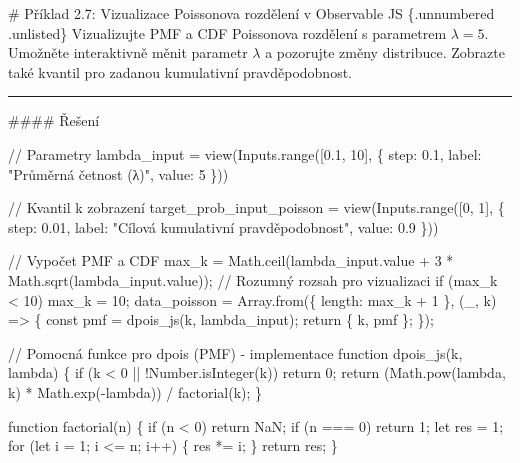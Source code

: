 \documentclass[
  czech,
  11pt,
  letterpaper,
  DIV=11,
  numbers=noendperiod]{scrreprt}
\newenvironment{Shaded}{\begin{snugshade}}{\end{snugshade}}
\newcommand{\NormalTok}[1]{\textcolor[rgb]{0.00,0.23,0.31}{#1}}
\begin{document}
\begin{tcolorbox}[enhanced jigsaw, arc=.35mm, bottomrule=.15mm, bottomtitle=1mm, breakable, colback=white, colbacktitle=quarto-callout-note-color!10!white, colframe=quarto-callout-note-color-frame, coltitle=black, left=2mm, leftrule=.75mm, opacityback=0, opacitybacktitle=0.6, rightrule=.15mm, title=\textcolor{quarto-callout-note-color}{\faInfo}\hspace{0.5em}{Poznámka}, titlerule=0mm, toprule=.15mm, toptitle=1mm]

\# Příklad 2.7: Vizualizace Poissonova rozdělení v Observable JS
\{.unnumbered .unlisted\} Vizualizujte PMF a CDF Poissonova rozdělení s
parametrem \(\lambda=5\). Umožněte interaktivně měnit parametr
\(\lambda\) a pozorujte změny distribuce. Zobrazte také kvantil pro
zadanou kumulativní pravděpodobnost.

\begin{center}\rule{0.5\linewidth}{0.5pt}\end{center}

\#\#\#\# Řešení

\begin{Shaded}
\begin{Highlighting}[]
\NormalTok{// Parametry}
\NormalTok{lambda\_input = view(Inputs.range([0.1, 10], \{ step: 0.1, label: "Průměrná četnost (λ)", value: 5 \}))}

\NormalTok{// Kvantil k zobrazení}
\NormalTok{target\_prob\_input\_poisson = view(Inputs.range([0, 1], \{ step: 0.01, label: "Cílová kumulativní pravděpodobnost", value: 0.9 \}))}

\NormalTok{// Vypočet PMF a CDF}
\NormalTok{max\_k = Math.ceil(lambda\_input.value + 3 * Math.sqrt(lambda\_input.value)); // Rozumný rozsah pro vizualizaci}
\NormalTok{if (max\_k \textless{} 10) max\_k = 10;}
\NormalTok{data\_poisson = Array.from(\{ length: max\_k + 1 \}, (\_, k) =\textgreater{} \{}
\NormalTok{  const pmf = dpois\_js(k, lambda\_input);}
\NormalTok{  return \{ k, pmf \};}
\NormalTok{\});}

\NormalTok{// Pomocná funkce pro dpois (PMF) {-} implementace}
\NormalTok{function dpois\_js(k, lambda) \{}
\NormalTok{  if (k \textless{} 0 || !Number.isInteger(k)) return 0;}
\NormalTok{  return (Math.pow(lambda, k) * Math.exp({-}lambda)) / factorial(k);}
\NormalTok{\}}

\NormalTok{function factorial(n) \{}
\NormalTok{  if (n \textless{} 0) return NaN;}
\NormalTok{  if (n === 0) return 1;}
\NormalTok{  let res = 1;}
\NormalTok{  for (let i = 1; i \textless{}= n; i++) \{}
\NormalTok{    res *= i;}
\NormalTok{  \}}
\NormalTok{  return res;}
\NormalTok{\}}


\end{Highlighting}
\end{Shaded}
\end{tcolorbox}
\end{document}
